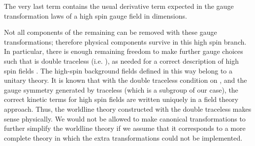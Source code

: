 \documentclass[a4paper,12pt]{article}
\begin{document}
The very last term contains the usual derivative term expected in the gauge
transformation laws of a high spin gauge field in \coordHE{} dimensions.

Not all components of the remaining \coordHE{} can be removed with these gauge
transformations; therefore physical components survive in this high spin
branch. In particular, there is enough remaining freedom to make further
gauge choices such that \coordHE{} is double
traceless (i.e. \coordHE{}),
as needed for a correct description of high spin fields \cite{fronsdal}. The
high-spin background fields defined in this way belong to a unitary theory.
It is known that with the double traceless condition on \coordHE{}, and the
gauge symmetry generated by traceless \coordHE{} (which is a
subgroup of our case), the correct kinetic terms for high spin fields are
written uniquely in a field theory approach. Thus, the worldline theory
constructed with the double traceless \coordHE{} makes sense physically. We
would not be allowed to make canonical transformations to further simplify
the worldline theory if we assume that it corresponds to a more complete
theory in which the extra transformations could not be implemented.
\end{document}
